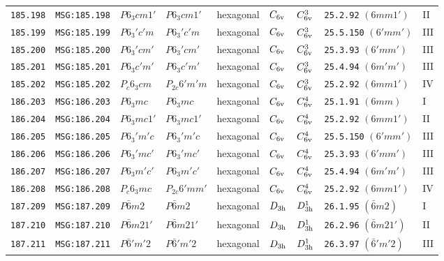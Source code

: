 \documentclass[fleqn,10pt]{jsarticle}
\begin{document}
\begin{center}
\begin{longtable}{lllllllll}
\texttt{185.198} & \texttt{MSG:185.198} & $P6_{3}cm1'$ & $P6_{3}cm1'$ & hexagonal & $C_{\rm 6v}$ & $C_{\rm 6v}^{3}$ & \texttt{25.2.92} $(6mm1')$ & II \\
\texttt{185.199} & \texttt{MSG:185.199} & $P6_{3}'c'm$ & $P6_{3}'c'm$ & hexagonal & $C_{\rm 6v}$ & $C_{\rm 6v}^{3}$ & \texttt{25.5.150} $(6'mm')$ & III \\
\texttt{185.200} & \texttt{MSG:185.200} & $P6_{3}'cm'$ & $P6_{3}'cm'$ & hexagonal & $C_{\rm 6v}$ & $C_{\rm 6v}^{3}$ & \texttt{25.3.93} $(6'mm')$ & III \\
\texttt{185.201} & \texttt{MSG:185.201} & $P6_{3}c'm'$ & $P6_{3}c'm'$ & hexagonal & $C_{\rm 6v}$ & $C_{\rm 6v}^{3}$ & \texttt{25.4.94} $(6m'm')$ & III \\
\texttt{185.202} & \texttt{MSG:185.202} & $P_{c}6_{3}cm$ & $P_{2c}6'm'm$ & hexagonal & $C_{\rm 6v}$ & $C_{\rm 6v}^{3}$ & \texttt{25.2.92} $(6mm1')$ & IV \\ \hline
\texttt{186.203} & \texttt{MSG:186.203} & $P6_{3}mc$ & $P6_{3}mc$ & hexagonal & $C_{\rm 6v}$ & $C_{\rm 6v}^{4}$ & \texttt{25.1.91} $(6mm)$ & I \\
\texttt{186.204} & \texttt{MSG:186.204} & $P6_{3}mc1'$ & $P6_{3}mc1'$ & hexagonal & $C_{\rm 6v}$ & $C_{\rm 6v}^{4}$ & \texttt{25.2.92} $(6mm1')$ & II \\
\texttt{186.205} & \texttt{MSG:186.205} & $P6_{3}'m'c$ & $P6_{3}'m'c$ & hexagonal & $C_{\rm 6v}$ & $C_{\rm 6v}^{4}$ & \texttt{25.5.150} $(6'mm')$ & III \\
\texttt{186.206} & \texttt{MSG:186.206} & $P6_{3}'mc'$ & $P6_{3}'mc'$ & hexagonal & $C_{\rm 6v}$ & $C_{\rm 6v}^{4}$ & \texttt{25.3.93} $(6'mm')$ & III \\
\texttt{186.207} & \texttt{MSG:186.207} & $P6_{3}m'c'$ & $P6_{3}m'c'$ & hexagonal & $C_{\rm 6v}$ & $C_{\rm 6v}^{4}$ & \texttt{25.4.94} $(6m'm')$ & III \\
\texttt{186.208} & \texttt{MSG:186.208} & $P_{c}6_{3}mc$ & $P_{2c}6'mm'$ & hexagonal & $C_{\rm 6v}$ & $C_{\rm 6v}^{4}$ & \texttt{25.2.92} $(6mm1')$ & IV \\ \hline
\texttt{187.209} & \texttt{MSG:187.209} & $P\bar{6}m2$ & $P\bar{6}m2$ & hexagonal & $D_{\rm 3h}$ & $D_{\rm 3h}^{1}$ & \texttt{26.1.95} $(\bar{6}m2)$ & I \\
\texttt{187.210} & \texttt{MSG:187.210} & $P\bar{6}m21'$ & $P\bar{6}m21'$ & hexagonal & $D_{\rm 3h}$ & $D_{\rm 3h}^{1}$ & \texttt{26.2.96} $(\bar{6}m21')$ & II \\
\texttt{187.211} & \texttt{MSG:187.211} & $P\bar{6}'m'2$ & $P\bar{6}'m'2$ & hexagonal & $D_{\rm 3h}$ & $D_{\rm 3h}^{1}$ & \texttt{26.3.97} $(\bar{6}'m'2)$ & III \\

\end{longtable}
\end{center}
\end{document}
